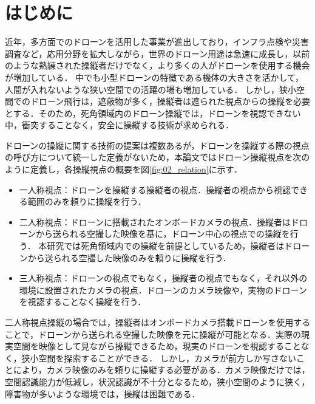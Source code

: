 \documentclass[submit]{ipsj}
\begin{document}
\section{はじめに}
\label{sec:Introduction}
近年，多方面でのドローンを活用した事業が進出しており，インフラ点検や災害調査など，応用分野を拡大しながら，世界のドローン用途は急速に成長し，以前のような熟練された操縦者だけでなく，より多くの人がドローンを使用する機会が増加している\cite{article-drone01}\cite{article-drone02}．
中でも小型ドローンの特徴である機体の大きさを活かして，人間が入れないような狭い空間での活躍の場も増加している\cite{article-drone04}\cite{article-drone05}．
しかし，狭小空間でのドローン飛行は，遮蔽物が多く，操縦者は遮られた視点からの操縦を必要とする\cite{article-drone03}．そのため，死角領域内のドローン操縦では，ドローンを視認できない中，衝突することなく，安全に操縦する技術が求められる．
\par
ドローンの操縦に関する技術の提案は複数あるが\cite{article-drone07}\cite{article-ar01}\cite{book-drone05}，ドローンを操縦する際の視点の呼び方について統一した定義がないため，本論文ではドローン操縦視点を次のように定義し，各操縦視点の概要を図\ref{fig:02_relation}に示す．
\begin{itemize}
  \item 一人称視点\mbox{}：ドローンを操縦する操縦者の視点．操縦者の視点から視認できる範囲のみを頼りに操縦を行う．
  \item 二人称視点\mbox{}：ドローンに搭載されたオンボードカメラの視点．操縦者はドローンから送られる空撮した映像を基に，ドローン中心の視点での操縦を行う．
  本研究では死角領域内での操縦を前提としているため，操縦者はドローンから送られる空撮した映像のみを頼りに操縦を行う．
  \item 三人称視点\mbox{}：ドローンの視点でもなく，操縦者の視点でもなく，それ以外の環境に設置されたカメラの視点．ドローンのカメラ映像や，実物のドローンを視認することなく操縦を行う．
\end{itemize}
二人称視点操縦の場合では，操縦者はオンボードカメラ搭載ドローンを使用することで，ドローンから送られる空撮した映像を元に操縦が可能となる\cite{article-drone08}．実際の現実空間を映像として見ながら操縦できるため，現実のドローンを視認することなく，狭小空間を探索することができる\cite{book-drone02}．
しかし，カメラが前方しか写さないことにより\cite{article-drone09}，カメラ映像のみを頼りに操縦する必要がある．カメラ映像だけでは，空間認識能力が低減し\cite{article-drone10}，状況認識が不十分となるため\cite{article-drone11}\cite{book-drone03}，狭小空間のように狭く，障害物が多いような環境では，操縦は困難である．
\par
\end{document}
